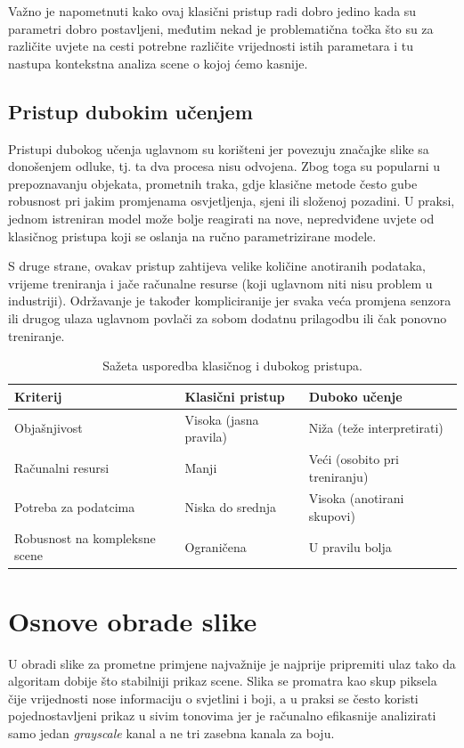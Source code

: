 Važno je napometnuti kako ovaj klasični pristup radi dobro jedino kada su parametri dobro postavljeni, međutim nekad je problematična točka što su za različite uvjete na cesti potrebne različite vrijednosti istih parametara i tu nastupa kontekstna analiza scene o kojoj ćemo kasnije.

\subsection{Pristup dubokim učenjem}
Pristupi dubokog učenja uglavnom su korišteni jer povezuju značajke slike sa donošenjem odluke, tj. ta dva procesa nisu odvojena. Zbog toga su popularni u prepoznavanju objekata, prometnih traka, gdje klasične metode često gube robusnost pri jakim promjenama osvjetljenja, sjeni ili složenoj pozadini. U praksi, jednom istreniran model može bolje reagirati na nove, nepredviđene uvjete od klasičnog pristupa koji se oslanja na ručno parametrizirane modele.

S druge strane, ovakav pristup zahtijeva velike količine anotiranih podataka, vrijeme treniranja i jače računalne resurse (koji uglavnom niti nisu problem u industriji). Održavanje je također kompliciranije jer svaka veća promjena senzora ili drugog ulaza uglavnom povlači za sobom dodatnu prilagodbu ili čak ponovno treniranje.

\begin{table}[H]
    \centering
    \caption{Sažeta usporedba klasičnog i dubokog pristupa.}
    \label{tab:classic-vs-dl}
    \begin{tabular}{|l|l|l|}
        \hline
        Kriterij                      & Klasični pristup       & Duboko učenje                 \\
        \hline
        Objašnjivost                  & Visoka (jasna pravila) & Niža (teže interpretirati)    \\
        \hline
        Računalni resursi             & Manji                  & Veći (osobito pri treniranju) \\
        \hline
        Potreba za podatcima          & Niska do srednja       & Visoka (anotirani skupovi)    \\
        \hline
        Robusnost na kompleksne scene & Ograničena             & U pravilu bolja               \\
        \hline
    \end{tabular}
\end{table}

\section{Osnove obrade slike}
U obradi slike za prometne primjene najvažnije je najprije pripremiti ulaz tako da algoritam dobije što stabilniji prikaz scene. Slika se promatra kao skup piksela čije vrijednosti nose informaciju o svjetlini i boji, a u praksi se često koristi pojednostavljeni prikaz u sivim tonovima jer je računalno efikasnije analizirati samo jedan \textit{grayscale} kanal a ne tri zasebna kanala za boju.

